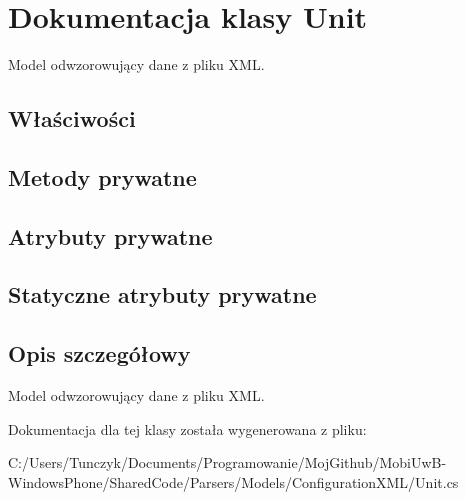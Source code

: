 \hypertarget{a00076}{}\section{Dokumentacja klasy Unit}
\label{a00076}


Model odwzorowujący dane z pliku X\+M\+L.  


\subsection*{Właściwości}
\subsection*{Metody prywatne}
\subsection*{Atrybuty prywatne}
\subsection*{Statyczne atrybuty prywatne}


\subsection{Opis szczegółowy}
Model odwzorowujący dane z pliku X\+M\+L. 



Dokumentacja dla tej klasy została wygenerowana z pliku\+:\begin{DoxyCompactItemize}
\item 
C\+:/\+Users/\+Tunczyk/\+Documents/\+Programowanie/\+Moj\+Github/\+Mobi\+Uw\+B-\/\+Windows\+Phone/\+Shared\+Code/\+Parsers/\+Models/\+Configuration\+X\+M\+L/Unit.\+cs\end{DoxyCompactItemize}
